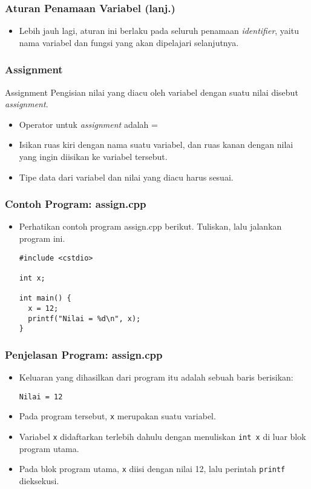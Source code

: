 \begin{frame}
\frametitle{Aturan Penamaan Variabel (lanj.)}
\begin{itemize}
  \item Lebih jauh lagi, aturan ini berlaku pada seluruh penamaan \alert{\textit{identifier}}, yaitu nama variabel dan fungsi yang akan dipelajari selanjutnya.
\end{itemize}
\end{frame}

\begin{frame}
\frametitle{Assignment}
\begin{block}{Assignment}
  Pengisian nilai yang diacu oleh variabel dengan suatu nilai disebut \alert{\textit{assignment}.}
\end{block}
\begin{itemize}
  \item Operator untuk \textit{assignment} adalah =
  \item Isikan ruas kiri dengan nama suatu variabel, dan ruas kanan dengan nilai yang ingin diisikan ke variabel tersebut.
  \item Tipe data dari variabel dan nilai yang diacu \alert{harus sesuai}.
\end{itemize}
\end{frame}


\begin{frame}[fragile]
\frametitle{Contoh Program: assign.cpp}
\begin{itemize}
  \item Perhatikan contoh program assign.cpp berikut. Tuliskan, lalu jalankan program ini.
  \begin{lstlisting}
#include <cstdio>

int x;

int main() {
  x = 12;
  printf("Nilai = %d\n", x);
}\end{lstlisting}
\end{itemize}
\end{frame}

\begin{frame}[fragile]
\frametitle{Penjelasan Program: assign.cpp}
\begin{itemize}
  \item Keluaran yang dihasilkan dari program itu adalah sebuah baris berisikan:
\begin{lstlisting}
Nilai = 12
\end{lstlisting}
  \item Pada program tersebut, \texttt{x} merupakan suatu variabel.
  \item Variabel \texttt{x} didaftarkan terlebih dahulu dengan menuliskan \texttt{int x} di luar blok program utama.
  \item Pada blok program utama, \texttt{x} diisi dengan nilai 12, lalu perintah \texttt{printf} dieksekusi.
\end{itemize}
\end{frame}

